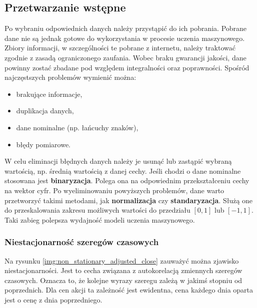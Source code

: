 \documentclass[a4paper, twoside, 11pt, openright]{article}
\begin{document}
\subsection{Przetwarzanie wstępne}

Po wybraniu odpowiednich danych należy przystąpić do ich pobrania. Pobrane dane nie są jednak gotowe do wykorzystania w procesie uczenia maszynowego. Zbiory informacji, w szczególności te pobrane z internetu, należy traktować zgodnie z zasadą ograniczonego zaufania. Wobec braku gwarancji jakości, dane powinny zostać zbadane pod względem integralności oraz poprawności. Spośród najczęstszych problemów wymienić można: 
\begin{itemize}
    \item brakujące informacje,
    \item duplikacja danych,
    \item dane nominalne (np. łańcuchy znaków),
    \item błędy pomiarowe.
\end{itemize}

W celu eliminacji błędnych danych należy je usunąć lub zastąpić wybraną wartością, np. średnią wartością z danej cechy. Jeśli chodzi o dane nominalne stosowana jest \textbf{binaryzacja}. Polega ona na odpowiednim przekształceniu cechy na wektor cyfr. Po wyeliminowaniu powyższych problemów, dane warto przetworzyć takimi metodami, jak \textbf{normalizacja} czy \textbf{standaryzacja}. Służą one do przeskalowania zakresu możliwych wartości do przedziału $[0,1]$ lub $[-1,1]$. Taki zabieg polepsza wydajność modeli uczenia maszynowego.

\bigskip

\subsubsection{Niestacjonarność szeregów czasowych}

Na rysunku \ref{img:non_stationary_adjusted_close} zauważyć można zjawisko niestacjonarności. Jest to cecha związana z autokorelacją zmiennych szeregów czasowych. Oznacza to, że kolejne wyrazy szeregu zależą w jakimś stopniu od poprzednich. Dla cen akcji ta zależność jest ewidentna, cena każdego dnia oparta jest o cenę z dnia poprzedniego. 
\end{document}
